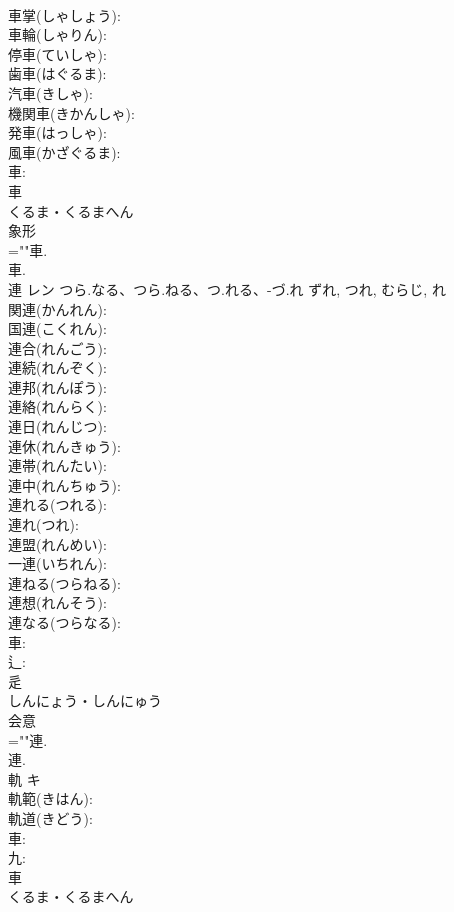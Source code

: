 \documentclass[8pt]{extreport}
\begin{document}
\begin{CJK}{UTF8}{min}
\\	車掌(しゃしょう): 
\\	車輪(しゃりん): 
\\	停車(ていしゃ): 
\\	歯車(はぐるま): 
\\	汽車(きしゃ): 
\\	機関車(きかんしゃ): 
\\	発車(はっしゃ): 
\\	風車(かざぐるま): 
\\	車: 
\\	車	
\\	くるま・くるまへん	
\\	象形 
\\	=""車.
\\	車.
\\	連	レン	つら.なる、つら.ねる、つ.れる、-づ.れ	ずれ, つれ, むらじ, れ	
\\	関連(かんれん): 
\\	国連(こくれん): 
\\	連合(れんごう): 
\\	連続(れんぞく): 
\\	連邦(れんぽう): 
\\	連絡(れんらく): 
\\	連日(れんじつ): 
\\	連休(れんきゅう): 
\\	連帯(れんたい): 
\\	連中(れんちゅう): 
\\	連れる(つれる): 
\\	連れ(つれ): 
\\	連盟(れんめい): 
\\	一連(いちれん): 
\\	連ねる(つらねる): 
\\	連想(れんそう): 
\\	連なる(つらなる): 
\\	車: 
\\	辶: 
\\	辵	
\\	しんにょう・しんにゅう	
\\	会意 
\\	=""連.
\\	連.
\\	軌	キ			
\\	軌範(きはん): 
\\	軌道(きどう): 
\\	車: 
\\	九: 
\\	車	
\\	くるま・くるまへん	

\end{CJK}
\end{document}
